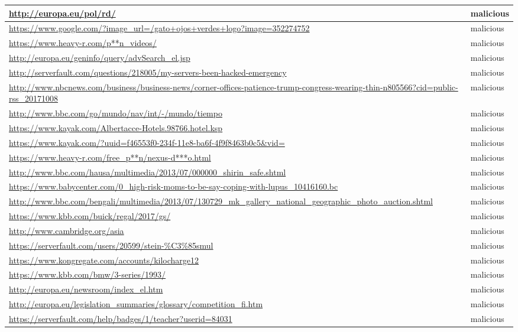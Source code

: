 \documentclass[12pt,twoside]{report}
\begin{document}
\begin{spacing}{1}
\begin{center}
\begin{longtable}{ |>{\raggedright\arraybackslash}p{}|>{\raggedright\arraybackslash}p{}| }
\url{http://europa.eu/pol/rd/} & malicious
\\
\hline
\url{https://www.google.com/?image_url=/gato+ojos+verdes+logo?image=352274752} & malicious
\\
\hline
\url{https://www.heavy-r.com/p**n_videos/} & malicious
\\
\hline
\url{http://europa.eu/geninfo/query/advSearch_el.jsp} & malicious
\\
\hline
\url{http://serverfault.com/questions/218005/my-servers-been-hacked-emergency} & malicious
\\
\hline
\url{http://www.nbcnews.com/business/business-news/corner-offices-patience-trump-congress-wearing-thin-n805566?cid=public-rss_20171008} & malicious
\\
\hline
\url{http://www.bbc.com/go/mundo/nav/int/-/mundo/tiempo} & malicious
\\
\hline
\url{https://www.kayak.com/Albertacce-Hotels.98766.hotel.ksp} & malicious
\\
\hline
\url{https://www.kayak.com/?uuid=f46553f0-234f-11e8-ba6f-4f9f8463b0c5&vid=} & malicious
\\
\hline
\url{https://www.heavy-r.com/free_p**n/nexus-d***o.html} & malicious
\\
\hline
\url{http://www.bbc.com/hausa/multimedia/2013/07/000000_shirin_safe.shtml} & malicious
\\
\hline
\url{https://www.babycenter.com/0_high-risk-moms-to-be-say-coping-with-lupus_10416160.bc} & malicious
\\
\hline
\url{http://www.bbc.com/bengali/multimedia/2013/07/130729_mk_gallery_national_geographic_photo_auction.shtml} & malicious
\\
\hline
\url{https://www.kbb.com/buick/regal/2017/gs/} & malicious
\\
\hline
\url{http://www.cambridge.org/asia} & malicious
\\
\hline
\url{https://serverfault.com/users/20599/stein-\%C3\%85smul} & malicious
\\
\hline
\url{https://www.kongregate.com/accounts/kilocharge12} & malicious
\\
\hline
\url{https://www.kbb.com/bmw/3-series/1993/} & malicious
\\
\hline
\url{http://europa.eu/newsroom/index_el.htm} & malicious
\\
\hline
\url{http://europa.eu/legislation_summaries/glossary/competition_fi.htm} & malicious
\\
\hline
\url{https://serverfault.com/help/badges/1/teacher?userid=84031} & malicious

\end{longtable}
\end{center}
\end{spacing}
\end{document}
